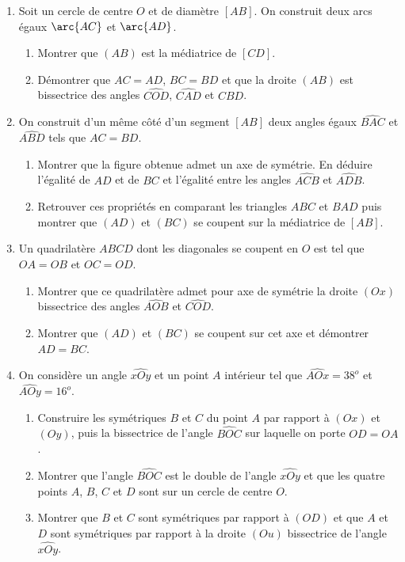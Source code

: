 \documentclass[12 pt]{report}
\theoremstyle{plain}
\newcounter{n}
\begin{document}
\begin{enumerate}
\begin{enumerate}
\end{enumerate}
\item Soit un cercle de centre $O$ et de diamètre $[AB]$. On construit deux arcs
égaux $\arc{AC}$ et $\arc{AD}$. \begin{enumerate}
\item Montrer que $(AB)$ est la médiatrice de $[CD]$.
\item Démontrer que $AC=AD$, $BC=BD$ et que la droite $(AB)$ est bissectrice des 
angles $\widehat{COD}$, $\widehat{CAD}$ et $\widehat{CBD}$. 
\end{enumerate}
\item On construit d'un même côté d'un segment $[AB]$ deux angles égaux 
$\widehat{BAC}$ et $\widehat{ABD}$ tels que $AC=BD$. \begin{enumerate}
\item Montrer que la figure obtenue admet un axe de symétrie. En déduire l'égalité de 
$AD$ et de $BC$ et l'égalité entre les angles $\widehat{ACB}$ et $\widehat{ADB}$.
\item Retrouver ces propriétés en comparant les triangles $ABC$ et $BAD$ puis montrer
que $(AD)$ et $(BC)$ se coupent sur la médiatrice de $[AB]$. 
\end{enumerate}
\item Un quadrilatère $ABCD$ dont les diagonales se coupent en $O$ est tel que $OA=OB$ et $OC=OD$. \begin{enumerate}
\item Montrer que ce quadrilatère admet pour axe de symétrie la droite $(Ox)$ bissectrice des angles $\widehat{AOB}$ et $\widehat{COD}$. 
\item Montrer que $(AD)$ et $(BC)$ se coupent sur cet axe et démontrer $AD=BC$.
\end{enumerate}
\item On considère un angle $\widehat{xOy}$ et un point $A$ intérieur tel que $\widehat{AOx}=38^o$ et $\widehat{AOy}= 16^o$. \begin{enumerate}
\item Construire les symétriques $B$ et $C$ du point $A$ par rapport à $(Ox)$ et $(Oy)$, puis la bissectrice de l'angle $\widehat{BOC}$ sur laquelle on porte $OD=OA$. 
\item Montrer que l'angle $\widehat{BOC}$ est le double de l'angle $\widehat{xOy}$
et que les quatre points $A$, $B$, $C$ et $D$ sont sur un cercle de centre $O$. 
\item Montrer que $B$ et $C$ sont symétriques par rapport à $(OD)$ 
et que $A$ et $D$ sont symétriques par rapport à la droite $(Ou)$ bissectrice de l'angle $\widehat{xOy}$. 
\end{enumerate}
\end{enumerate}
\end{document}
